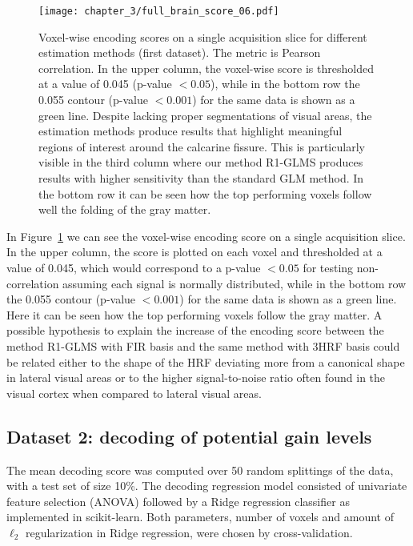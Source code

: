 \begin{figure}
\centering
\texttt{[image: chapter\_3/full\_brain\_score\_06.pdf]}
\caption{\label{fig:brain_img}
Voxel-wise encoding scores on a single acquisition slice for different estimation methods (first dataset).
The metric is Pearson correlation.  
In the upper column, the voxel-wise score is thresholded at a value of 
0.045 (p-value $< 0.05$), 
while in the bottom row the 0.055 contour (p-value $< 0.001$) for the same data is shown as a green line. 
Despite lacking proper segmentations of visual areas,
the estimation methods produce results that highlight 
meaningful regions of interest around the calcarine fissure.
This is particularly visible in the third 
column where our method R1-GLMS produces results with higher
sensitivity
than the standard GLM method. In the bottom row it can be seen how the top performing voxels
follow well the folding of the gray matter.
}
\end{figure}

In Figure~\ref{fig:brain_img} we can see the voxel-wise encoding score on a single
acquisition slice. In the upper column, the score is plotted on each voxel and
thresholded at a value of 0.045, which would correspond to a p-value $< 0.05$
for testing non-correlation assuming each signal is normally distributed,
while in the bottom row the 0.055 contour (p-value $< 0.001$) for the same
data is shown as a green line. Here it can be seen how the top performing
voxels follow the gray matter. A possible hypothesis to explain the increase of the encoding score
between the method R1-GLMS with FIR basis and the same method with 3HRF basis
could be related either to the shape of the HRF deviating more from a canonical
shape in lateral visual areas or to the higher signal-to-noise ratio often found in the visual cortex when compared to lateral visual areas.

\subsection{Dataset 2: decoding of potential gain levels}

The mean decoding score was computed over 50 random splittings of the data,
with a test set of size 10\%. The decoding regression model consisted of
univariate feature selection (ANOVA) followed by a Ridge regression
classifier as implemented in scikit-learn. Both
parameters, number of voxels and amount of $\ell_2$ regularization in Ridge regression,
were chosen by cross-validation. 

